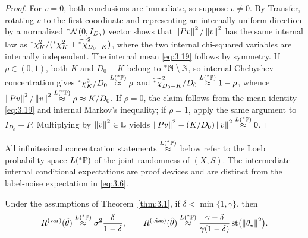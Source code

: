 \begin{proof}
For $v = 0$, both conclusions are immediate, so suppose $v \neq 0$. By Transfer, rotating $v$ to the first coordinate and representing an internally uniform direction by a normalized ${}^*\mathcal{N}(0, I_{D_0})$ vector shows that $\left\lVert Pv \right\rVert^2 / \left\lVert v \right\rVert^2$ has the same internal law as ${}^*\chi^2_K / ({}^*\chi^2_K + \widetilde{{}^*\chi}^2_{D_0 - K})$, where the two internal chi-squared variables are internally independent. The internal mean \eqref{eq:3.19} follows by symmetry. If $\rho \in (0, 1)$, both $K$ and $D_0 - K$ belong to ${}^*\mathbb{N} \setminus \mathbb{N}$, so internal Chebyshev concentration gives ${}^*\chi^2_K / D_0 \stackrel{L({}^*\mathbb{P})}{\approx} \rho$ and $\widetilde{{}^*\chi}^2_{D_0 - K} / D_0 \stackrel{L({}^*\mathbb{P})}{\approx} 1 - \rho$, whence $\left\lVert Pv \right\rVert^2 / \left\lVert v \right\rVert^2 \stackrel{L({}^*\mathbb{P})}{\approx} \rho \approx K / D_0$. If $\rho = 0$, the claim follows from the mean identity \eqref{eq:3.19} and internal Markov's inequality; if $\rho = 1$, apply the same argument to $I_{D_0} - P$. Multiplying by $\left\lVert v \right\rVert^2 \in \mathbb{L}$ yields $\left\lVert Pv \right\rVert^2 - (K / D_0)\left\lVert v \right\rVert^2 \stackrel{L({}^*\mathbb{P})}{\approx} 0$.
\end{proof}

All infinitesimal concentration statements $\stackrel{L({}^*\mathbb{P})}{\approx}$ below refer to the Loeb probability space $L({}^*\mathbb{P})$ of the joint randomness of $(X, S)$. The intermediate internal conditional expectations are proof devices and are distinct from the label-noise expectation in \eqref{eq:3.6}.

\begin{proposition}\label{prop:3.5}
Under the assumptions of Theorem~\ref{thm:3.1}, if $\delta < \min\{1, \gamma\}$, then
\begin{equation}\label{eq:3.20}
R^{(\mathrm{var})}(\hat{\theta}) \stackrel{L({}^*\mathbb{P})}{\approx} \sigma^2 \frac{\delta}{1 - \delta}, \qquad R^{(\mathrm{bias})}(\hat{\theta}) \stackrel{L({}^*\mathbb{P})}{\approx} \frac{\gamma - \delta}{\gamma(1 - \delta)} \operatorname{st}\bigl(\left\lVert \theta_\star \right\rVert^2\bigr).
\end{equation}
\end{proposition}


